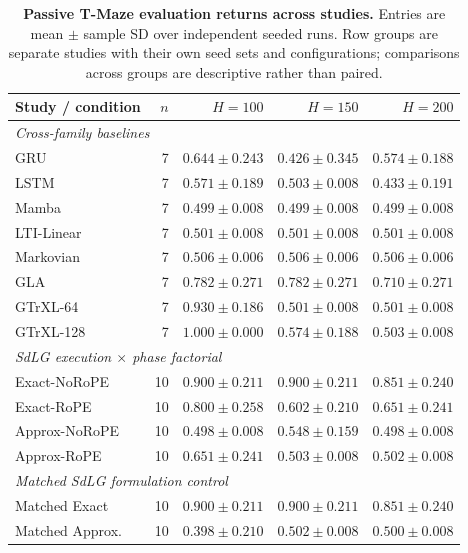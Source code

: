\begin{table}[H]
\centering\footnotesize
\setlength{\tabcolsep}{3.2pt}
\renewcommand{\arraystretch}{1.05}
\caption{\textbf{Passive T-Maze evaluation returns across studies.} Entries are mean $\pm$ sample SD over independent seeded runs. Row groups are separate studies with their own seed sets and configurations; comparisons across groups are descriptive rather than paired.}
\label{tab:tmaze_overview}
\begin{tabular}{lrrrr}
\toprule
Study / condition & $n$ & $H=100$ & $H=150$ & $H=200$ \\
\midrule
\multicolumn{5}{l}{\textit{Cross-family baselines}} \\
GRU              & 7  & $0.644\pm0.243$ & $0.426\pm0.345$ & $0.574\pm0.188$ \\
LSTM             & 7  & $0.571\pm0.189$ & $0.503\pm0.008$ & $0.433\pm0.191$ \\
Mamba            & 7  & $0.499\pm0.008$ & $0.499\pm0.008$ & $0.499\pm0.008$ \\
LTI-Linear       & 7  & $0.501\pm0.008$ & $0.501\pm0.008$ & $0.501\pm0.008$ \\
Markovian        & 7  & $0.506\pm0.006$ & $0.506\pm0.006$ & $0.506\pm0.006$ \\
GLA              & 7  & $0.782\pm0.271$ & $0.782\pm0.271$ & $0.710\pm0.271$ \\
GTrXL-64         & 7  & $0.930\pm0.186$ & $0.501\pm0.008$ & $0.501\pm0.008$ \\
GTrXL-128        & 7  & $1.000\pm0.000$ & $0.574\pm0.188$ & $0.503\pm0.008$ \\
\midrule
\multicolumn{5}{l}{\textit{SdLG execution $\times$ phase factorial}} \\
Exact-NoRoPE     & 10 & $0.900\pm0.211$ & $0.900\pm0.211$ & $0.851\pm0.240$ \\
Exact-RoPE       & 10 & $0.800\pm0.258$ & $0.602\pm0.210$ & $0.651\pm0.241$ \\
Approx-NoRoPE    & 10 & $0.498\pm0.008$ & $0.548\pm0.159$ & $0.498\pm0.008$ \\
Approx-RoPE      & 10 & $0.651\pm0.241$ & $0.503\pm0.008$ & $0.502\pm0.008$ \\
\midrule
\multicolumn{5}{l}{\textit{Matched SdLG formulation control}} \\
Matched Exact    & 10 & $0.900\pm0.211$ & $0.900\pm0.211$ & $0.851\pm0.240$ \\
Matched Approx.  & 10 & $0.398\pm0.210$ & $0.502\pm0.008$ & $0.500\pm0.008$ \\
\bottomrule
\end{tabular}
\end{table}

